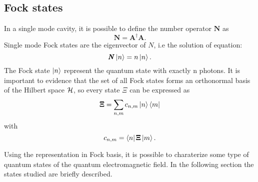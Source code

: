     \subsection{Fock states}
        In a single mode cavity, it is possible to define the number operator $\pmb{N}$ as
        \begin{equation}
            \pmb{N}=\pmb{A}^\dagger \pmb{A}.
        \end{equation}
        Single mode Fock states are the eigenvector of $N$, i.e the solution of equation:
        \begin{equation}
            \pmb{N}\ket{n}=n\ket{n}.
        \end{equation}
        The Fock state $\ket{n}$ represent the quantum state with exactly n photons.
        It is important to evidence that the set of all Fock states forms an orthonormal basis
        of the Hilbert space $\mathcal{H}$, so every state $\Xi$ can be expressed as
        \begin{equation}
            \pmb{\Xi} = \sum_{n,m} c_{n,m}\ket{n}\bra{m}
            \label{eq:QEF.4}
        \end{equation}
        with
        \begin{equation*}
            c_{n,m}=\bra{n}\pmb{\Xi}\ket{m}.
        \end{equation*}

        Using the representation in Fock basis, it is possible to charaterize some type of quantum 
        states of the quantum electromagnetic field. In the following section the states studied 
        are briefly described.